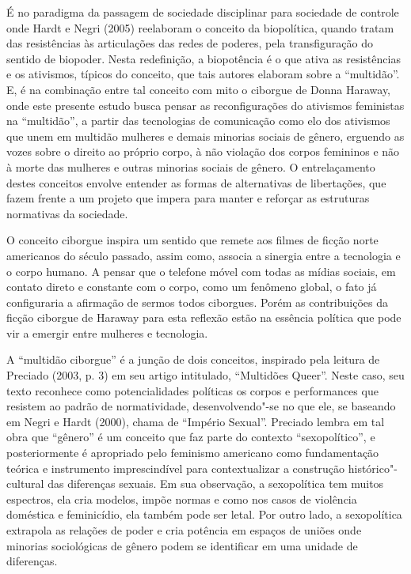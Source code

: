É no paradigma da passagem de sociedade disciplinar para sociedade de
controle onde Hardt e Negri (2005) reelaboram o conceito da biopolítica,
quando tratam das resistências às articulações das redes de poderes,
pela transfiguração do sentido de biopoder. Nesta redefinição, a
biopotência é o que ativa as resistências e os ativismos, típicos do
conceito, que tais autores elaboram sobre a ``multidão''. E, é na
combinação entre tal conceito com mito o ciborgue de Donna Haraway, onde
este presente estudo busca pensar as reconfigurações do ativismos
feministas na ``multidão'', a partir das tecnologias de comunicação como
elo dos ativismos que unem em multidão mulheres e demais minorias
sociais de gênero, erguendo as vozes sobre o direito ao próprio corpo, à
não violação dos corpos femininos e não à morte das mulheres e outras
minorias sociais de gênero. O entrelaçamento destes conceitos envolve
entender as formas de alternativas de libertações, que fazem frente a um
projeto que impera para manter e reforçar as estruturas normativas da
sociedade.

O conceito ciborgue inspira um sentido que remete aos filmes de ficção
norte americanos do século passado, assim como, associa a sinergia entre
a tecnologia e o corpo humano. A pensar que o telefone móvel com todas
as mídias sociais, em contato direto e constante com o corpo, como um
fenômeno global, o fato já configuraria a afirmação de sermos todos
ciborgues. Porém as contribuições da ficção ciborgue de Haraway para
esta reflexão estão na essência política que pode vir a emergir entre
mulheres e tecnologia.

A ``multidão ciborgue'' é a junção de dois conceitos, inspirado pela
leitura de Preciado (2003, p. 3) em seu artigo intitulado, ``Multidões
Queer''. Neste caso, seu texto reconhece como potencialidades políticas
os corpos e performances que resistem ao padrão de normatividade,
desenvolvendo"-se no que ele, se baseando em Negri e Hardt (2000), chama
de ``Império Sexual''. Preciado lembra em tal obra que ``gênero'' é um
conceito que faz parte do contexto ``sexopolítico'', e posteriormente é
apropriado pelo feminismo americano como fundamentação teórica e
instrumento imprescindível para contextualizar a construção
histórico"-cultural das diferenças sexuais. Em sua observação, a
sexopolítica tem muitos espectros, ela cria modelos, impõe normas e como
nos casos de violência doméstica e feminicídio, ela também pode ser
letal. Por outro lado, a sexopolítica extrapola as relações de poder e
cria potência em espaços de uniões onde minorias sociológicas de gênero
podem se identificar em uma unidade de diferenças.

